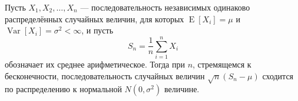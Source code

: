 \documentclass{article}
\begin{document}
Пусть $X_1, X_2, \dots, X_n$ --- последовательность независимых
одинаково распределённых случайных величин, для которых
$\operatorname{E}[X_i] = \mu$ и
$\operatorname{Var}[X_i] = \sigma^2 < \infty$, и пусть
\begin{equation*}
S_n = \frac{1}{n}\sum_{i=1}^{n} X_i
\end{equation*}
обозначает их среднее арифметическое. Тогда при $n$,
стремящемся к бесконечности, последовательность случайных
величин $\sqrt{n}(S_n - \mu)$ сходится по распределению
к нормальной $N(0, \sigma^2)$ величине.

\end{document}

